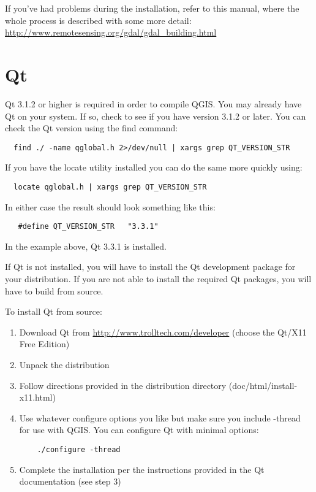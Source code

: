   If you've had problems during the installation, refer to this manual, where the whole process is described with some more detail: \url{http://www.remotesensing.org/gdal/gdal\_building.html} 

  \section{Qt}
  Qt 3.1.2 or higher is required in order to compile QGIS. You may already have Qt on your system. If so, check to see if you have version 3.1.2 or later. You can check the Qt version using the find command:
  \begin{verbatim}
  find ./ -name qglobal.h 2>/dev/null | xargs grep QT_VERSION_STR
  \end{verbatim}
  If you have the locate utility installed you can do the same more quickly using:
  \begin{verbatim}
  locate qglobal.h | xargs grep QT_VERSION_STR
  \end{verbatim}
  In either case the result should look something like this:
  \begin{verbatim}
   #define QT_VERSION_STR   "3.3.1"
   \end{verbatim} 
   In the example above, Qt 3.3.1 is installed.
   
  If Qt is not installed, you will have to install the Qt development package for your distribution. If you are not able to install the required Qt packages, you will have to build from source.
 
  To install Qt from source:
  \begin{enumerate}
  \item Download Qt from \url{http://www.trolltech.com/developer} (choose the Qt/X11 Free Edition)
  \item Unpack the distribution
  \item Follow directions provided in the distribution directory (doc/html/install-x11.html)
  \item Use whatever configure options you like but make sure you include -thread for use with QGIS. You can configure Qt with minimal options:
  \begin{verbatim}
    ./configure -thread
  \end{verbatim}

  \item Complete the installation per the instructions provided in the Qt documentation (see step 3)
  \end{enumerate}

